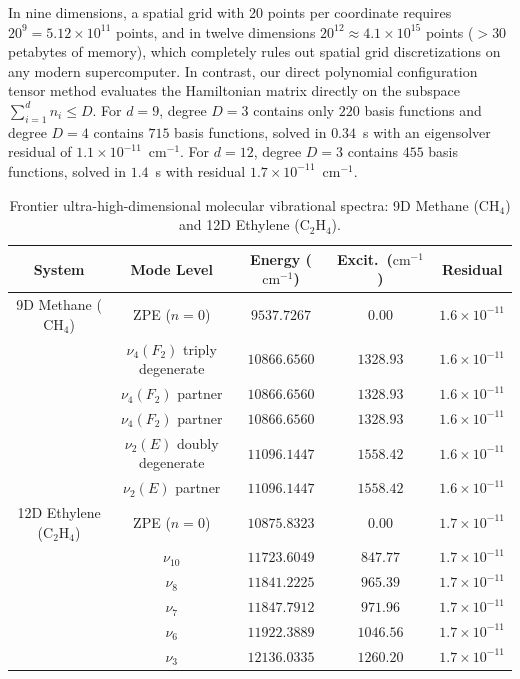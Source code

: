 \documentclass[11pt,a4paper]{article}
\newcommand{\cmi}{\ensuremath{\mathrm{cm}^{-1}}}
\begin{document}
In nine dimensions, a spatial grid with 20 points per coordinate requires $20^9 = 5.12 \times 10^{11}$ points, and in twelve dimensions $20^{12} \approx 4.1 \times 10^{15}$ points ($> 30$ petabytes of memory), which completely rules out spatial grid discretizations on any modern supercomputer.
In contrast, our direct polynomial configuration tensor method evaluates the Hamiltonian matrix directly on the subspace $\sum_{i=1}^d n_i \le D$. For $d = 9$, degree $D = 3$ contains only $220$ basis functions and degree $D = 4$ contains $715$ basis functions, solved in $0.34$~s with an eigensolver residual of $1.1 \times 10^{-11}$~\cmi. For $d = 12$, degree $D = 3$ contains $455$ basis functions, solved in $1.4$~s with residual $1.7 \times 10^{-11}$~\cmi.

\begin{table}[t]
\centering
\small
\setlength{\tabcolsep}{5pt}
\setlength{\tabcolsep}{4pt}
\caption{Frontier ultra-high-dimensional molecular vibrational spectra: 9D Methane ($\mathrm{CH}_4$) and 12D Ethylene ($\mathrm{C}_2\mathrm{H}_4$).}
\label{tab:9d_12d_results}
\begin{tabular}{ccccc}
\toprule
System & Mode Level & Energy (\cmi) & Excit.\ (\cmi) & Residual \\
\midrule
9D Methane ($\mathrm{CH}_4$) & ZPE ($n=0$) & $9537.7267$ & $0.00$ & $1.6 \times 10^{-11}$ \\
 & $\nu_4(F_2)$ triply degenerate & $10866.6560$ & $1328.93$ & $1.6 \times 10^{-11}$ \\
 & $\nu_4(F_2)$ partner & $10866.6560$ & $1328.93$ & $1.6 \times 10^{-11}$ \\
 & $\nu_4(F_2)$ partner & $10866.6560$ & $1328.93$ & $1.6 \times 10^{-11}$ \\
 & $\nu_2(E)$ doubly degenerate & $11096.1447$ & $1558.42$ & $1.6 \times 10^{-11}$ \\
 & $\nu_2(E)$ partner & $11096.1447$ & $1558.42$ & $1.6 \times 10^{-11}$ \\
\midrule
12D Ethylene ($\mathrm{C}_2\mathrm{H}_4$) & ZPE ($n=0$) & $10875.8323$ & $0.00$ & $1.7 \times 10^{-11}$ \\
 & $\nu_{10}$ & $11723.6049$ & $847.77$ & $1.7 \times 10^{-11}$ \\
 & $\nu_8$ & $11841.2225$ & $965.39$ & $1.7 \times 10^{-11}$ \\
 & $\nu_7$ & $11847.7912$ & $971.96$ & $1.7 \times 10^{-11}$ \\
 & $\nu_6$ & $11922.3889$ & $1046.56$ & $1.7 \times 10^{-11}$ \\
 & $\nu_3$ & $12136.0335$ & $1260.20$ & $1.7 \times 10^{-11}$ \\
\bottomrule
\end{tabular}
\end{table}
\end{document}
